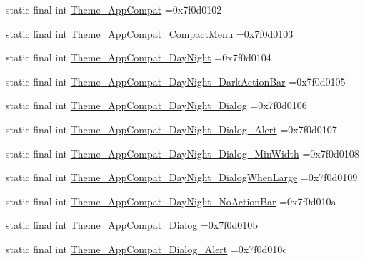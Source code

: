 \begin{DoxyCompactItemize}
\item 
static final int \mbox{\hyperlink{classcom_1_1example_1_1trainawearapplication_1_1_r_1_1style_a90bb187ec87b2fdf22ab2a7d6a798ac8}{Theme\+\_\+\+App\+Compat}} =0x7f0d0102
\item 
static final int \mbox{\hyperlink{classcom_1_1example_1_1trainawearapplication_1_1_r_1_1style_a1c3b9475caa6dad65b9594434b01f70c}{Theme\+\_\+\+App\+Compat\+\_\+\+Compact\+Menu}} =0x7f0d0103
\item 
static final int \mbox{\hyperlink{classcom_1_1example_1_1trainawearapplication_1_1_r_1_1style_afc68646b4b98dc6f915a7d976197e5a7}{Theme\+\_\+\+App\+Compat\+\_\+\+Day\+Night}} =0x7f0d0104
\item 
static final int \mbox{\hyperlink{classcom_1_1example_1_1trainawearapplication_1_1_r_1_1style_ae3370fda78036588bd19e440220562bd}{Theme\+\_\+\+App\+Compat\+\_\+\+Day\+Night\+\_\+\+Dark\+Action\+Bar}} =0x7f0d0105
\item 
static final int \mbox{\hyperlink{classcom_1_1example_1_1trainawearapplication_1_1_r_1_1style_ae92b3a0515a74c1dded90e475e01e093}{Theme\+\_\+\+App\+Compat\+\_\+\+Day\+Night\+\_\+\+Dialog}} =0x7f0d0106
\item 
static final int \mbox{\hyperlink{classcom_1_1example_1_1trainawearapplication_1_1_r_1_1style_a81e438a1baffa7c9f66905128eb0cb04}{Theme\+\_\+\+App\+Compat\+\_\+\+Day\+Night\+\_\+\+Dialog\+\_\+\+Alert}} =0x7f0d0107
\item 
static final int \mbox{\hyperlink{classcom_1_1example_1_1trainawearapplication_1_1_r_1_1style_a20e6d024b6682486366964259458a74e}{Theme\+\_\+\+App\+Compat\+\_\+\+Day\+Night\+\_\+\+Dialog\+\_\+\+Min\+Width}} =0x7f0d0108
\item 
static final int \mbox{\hyperlink{classcom_1_1example_1_1trainawearapplication_1_1_r_1_1style_a9571e8fc7699207b4d5af9bb35195c8d}{Theme\+\_\+\+App\+Compat\+\_\+\+Day\+Night\+\_\+\+Dialog\+When\+Large}} =0x7f0d0109
\item 
static final int \mbox{\hyperlink{classcom_1_1example_1_1trainawearapplication_1_1_r_1_1style_af38d9e9e29c25fe916b3d83bc209d77e}{Theme\+\_\+\+App\+Compat\+\_\+\+Day\+Night\+\_\+\+No\+Action\+Bar}} =0x7f0d010a
\item 
static final int \mbox{\hyperlink{classcom_1_1example_1_1trainawearapplication_1_1_r_1_1style_a819ac557d5ac3d82a3ee1675d1a7c349}{Theme\+\_\+\+App\+Compat\+\_\+\+Dialog}} =0x7f0d010b
\item 
static final int \mbox{\hyperlink{classcom_1_1example_1_1trainawearapplication_1_1_r_1_1style_a21111707c90a5096436cbcf2cdbc55f3}{Theme\+\_\+\+App\+Compat\+\_\+\+Dialog\+\_\+\+Alert}} =0x7f0d010c

\end{DoxyCompactItemize}
